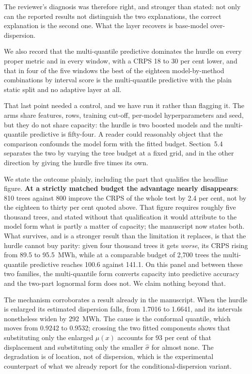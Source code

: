 \documentclass[11pt,a4paper]{article}
\begin{document}
The reviewer's diagnosis was therefore right, and stronger than stated: not only can the reported results not distinguish the two explanations, the correct explanation is the second one. What the layer recovers is base-model over-dispersion.

We also record that the multi-quantile predictive dominates the hurdle on every proper metric and in every window, with a CRPS 18 to 30 per cent lower, and that in four of the five windows the best of the eighteen model-by-method combinations by interval score is the multi-quantile predictive with the plain static split and no adaptive layer at all.

That last point needed a control, and we have run it rather than flagging it. The arms share features, rows, training cut-off, per-model hyperparameters and seed, but they do not share capacity: the hurdle is two boosted models and the multi-quantile predictive is fifty-four. A reader could reasonably object that the comparison confounds the model form with the fitted budget. Section~5.4 separates the two by varying the tree budget at a fixed grid, and in the other direction by giving the hurdle five times its own.

We state the outcome plainly, including the part that qualifies the headline figure. \textbf{At a strictly matched budget the advantage nearly disappears}: 810 trees against 800 improve the CRPS of the whole test by 2.4 per cent, not by the eighteen to thirty per cent quoted above. That figure requires roughly five thousand trees, and stated without that qualification it would attribute to the model form what is partly a matter of capacity; the manuscript now states both. What survives, and is a stronger result than the limitation it replaces, is that the hurdle cannot buy parity: given four thousand trees it gets \emph{worse}, its CRPS rising from 89.5 to 95.5~MWh, while at a comparable budget of 2{,}700 trees the multi-quantile predictive reaches 100.6 against 141.1. On this panel and between these two families, the multi-quantile form converts capacity into predictive accuracy and the two-part lognormal form does not. We claim nothing beyond that.

The mechanism corroborates a result already in the manuscript. When the hurdle is enlarged its estimated dispersion falls, from 1.7016 to 1.6641, and its intervals nonetheless widen by 292~MWh. The cause is the conformal quantile, which moves from 0.9242 to 0.9532; crossing the two fitted components shows that substituting only the enlarged $\mu(x)$ accounts for 93 per cent of that displacement and substituting only the smaller $\hat\sigma$ for almost none. The degradation is of location, not of dispersion, which is the experimental counterpart of what we already report for the conditional-dispersion variant.
\end{document}
